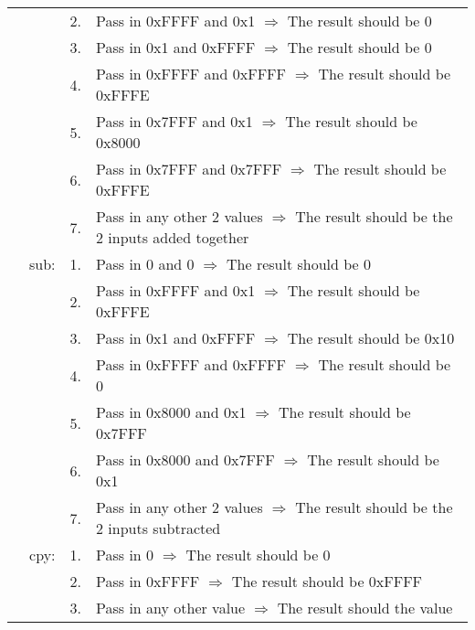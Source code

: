 \begin{longtable}{ r r r p{11cm} }
				                &      & 2. & Pass in 0xFFFF and 0x1 $\Rightarrow$ The result should be 0\\
				                &      & 3. & Pass in 0x1 and 0xFFFF $\Rightarrow$ The result should be 0\\
				                &      & 4. & Pass in 0xFFFF and 0xFFFF $\Rightarrow$ The result should be 0xFFFE\\
				                &      & 5. & Pass in 0x7FFF and 0x1 $\Rightarrow$ The result should be 0x8000\\
				                &      & 6. & Pass in 0x7FFF and 0x7FFF $\Rightarrow$ The result should be 0xFFFE\\
				                &      & 7. & Pass in any other 2 values $\Rightarrow$ The result should be the 2 inputs added together\\
				                & sub: & 1. & Pass in 0 and 0 $\Rightarrow$ The result should be 0\\
				                &      & 2. & Pass in 0xFFFF and 0x1 $\Rightarrow$ The result should be 0xFFFE\\
				                &      & 3. & Pass in 0x1 and 0xFFFF $\Rightarrow$ The result should be 0x10\\
				                &      & 4. & Pass in 0xFFFF and 0xFFFF $\Rightarrow$ The result should be 0\\
				                &      & 5. & Pass in 0x8000 and 0x1 $\Rightarrow$ The result should be 0x7FFF\\
				                &      & 6. & Pass in 0x8000 and 0x7FFF $\Rightarrow$ The result should be 0x1\\
				                &      & 7. & Pass in any other 2 values $\Rightarrow$ The result should be the 2 inputs subtracted\\
				                & cpy: & 1. & Pass in 0 $\Rightarrow$ The result should be 0\\
				                &      & 2. & Pass in 0xFFFF $\Rightarrow$ The result should be 0xFFFF\\
				                &      & 3. & Pass in any other value $\Rightarrow$ The result should the value\\
			\end{longtable}
